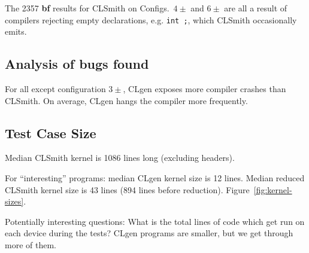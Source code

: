 

The 2357 \textbf{bf} results for CLSmith on Configs.\ $4\pm$ and $6\pm$ are all a result of compilers rejecting empty declarations, e.g. \texttt{int ;}, which CLSmith occasionally emits. %

\subsection{Analysis of bugs found}

For all except configuration $3\pm$, CLgen exposes more compiler crashes than CLSmith. On average, CLgen hangs the compiler more frequently.


\subsection{Test Case Size}

Median CLSmith kernel is 1086 lines long (excluding headers).

For ``interesting'' programs: median CLgen kernel size is 12 lines. Median reduced CLSmith kernel size is 43 lines (894 lines before reduction). Figure~\ref{fig:kernel-sizes}.

Potentially interesting questions: What is the total lines of code which get run on each device during the tests? CLgen programs are smaller, but we get through more of them.



